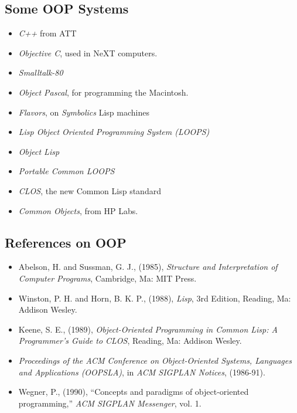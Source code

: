 \begin{slide}{}
\subsection{Some OOP Systems}
\begin{itemize}
\item {\em C++}\/ from ATT
\item {\em Objective C}, used in NeXT computers.
\item {\em Smalltalk-80}
\item {\em Object Pascal}, for programming the Macintosh.
\item {\em Flavors}, on {\em Symbolics}\/ Lisp machines
\item {\em Lisp Object Oriented Programming System (LOOPS)}
\item {\em Object Lisp}
\item {\em Portable Common LOOPS}
\item {\em CLOS}, the new Common Lisp standard
\item {\em Common Objects}, from HP Labs.
\end{itemize}
\end{slide}

\begin{slide}{}
\subsection{References on OOP}
\begin{itemize}
\item[]
Abelson, H. and Sussman, G. J., (1985), {\em Structure and Interpretation
of Computer Programs}, Cambridge, Ma: MIT Press.

\item[]
Winston, P. H. and Horn, B. K. P., (1988), {\em Lisp}, 3rd Edition,
Reading, Ma: Addison Wesley.

\item[]
Keene, S. E., (1989), {\em Object-Oriented Programming in Common Lisp: A
Programmer's Guide to CLOS}, Reading, Ma: Addison Wesley.

\item[]
{\em Proceedings of the ACM Conference on Object-Oriented Systems, Languages
and Applications (OOPSLA)}, in {\em ACM SIGPLAN Notices}, (1986-91).

\item[]
Wegner, P., (1990), ``Concepts and paradigms of object-oriented
programming,'' {\em ACM SIGPLAN Messenger}, vol. 1.
\end{itemize}
\end{slide}

